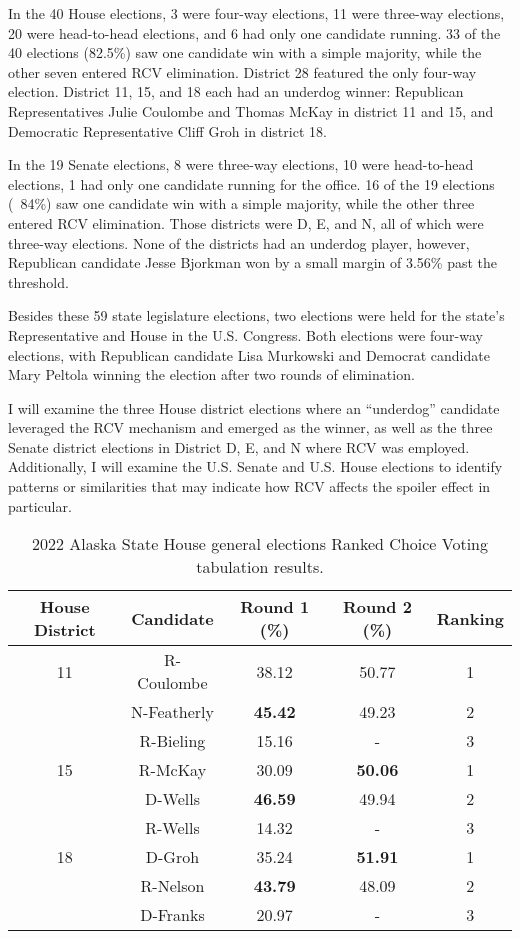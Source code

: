 In the 40 House elections, 3 were four-way elections, 11 were three-way elections, 20 were head-to-head elections, and 6 had only one candidate running. 33 of the 40 elections (82.5\%) saw one candidate win with a simple majority, while the other seven entered RCV elimination. District 28 featured the only four-way election. District 11, 15, and 18 each had an underdog winner: Republican Representatives Julie Coulombe and Thomas McKay in district 11 and 15, and Democratic Representative Cliff Groh in district 18. 

In the 19 Senate elections, 8 were three-way elections, 10 were head-to-head elections, 1 had only one candidate running for the office. 16 of the 19 elections (~84\%) saw one candidate win with a simple majority, while the other three entered RCV elimination. Those districts were D, E, and N, all of which were three-way elections. None of the districts had an underdog player, however, Republican candidate Jesse Bjorkman won by a small margin of 3.56\% past the threshold. 

Besides these 59 state legislature elections, two elections were held for the state’s Representative and House in the U.S. Congress. Both elections were four-way elections, with Republican candidate Lisa Murkowski and Democrat candidate Mary Peltola winning the election after two rounds of elimination. 

I will examine the three House district elections where an “underdog” candidate leveraged the RCV mechanism and emerged as the winner, as well as the three Senate district elections in District D, E, and N where RCV was employed. Additionally, I will examine the U.S. Senate and U.S. House elections to identify patterns or similarities that may indicate how RCV affects the spoiler effect in particular. 

\begin{table}[h!]
\centering
\begin{tabular}{|c|c|c|c|c|}
\hline
House District & Candidate & Round 1 (\%) & Round 2 (\%) & Ranking \\ \hline
11 & R-Coulombe & 38.12 & 50.77 & 1 \\ \hline
& N-Featherly & \textbf{45.42} & 49.23 & 2 \\ \hline
& R-Bieling & 15.16 & - & 3 \\ \hline
15 & R-McKay & 30.09 & \textbf{50.06} & 1 \\ \hline
& D-Wells & \textbf{46.59} & 49.94 & 2 \\ \hline
& R-Wells & 14.32 & - & 3 \\ \hline
18 & D-Groh & 35.24 & \textbf{51.91} & 1 \\ \hline
& R-Nelson & \textbf{43.79} & 48.09 & 2 \\ \hline
& D-Franks & 20.97 & - & 3 \\ \hline
\end{tabular}
\caption{2022 Alaska State House general elections Ranked Choice Voting tabulation results.}
\label{tab:2}
\end{table}

